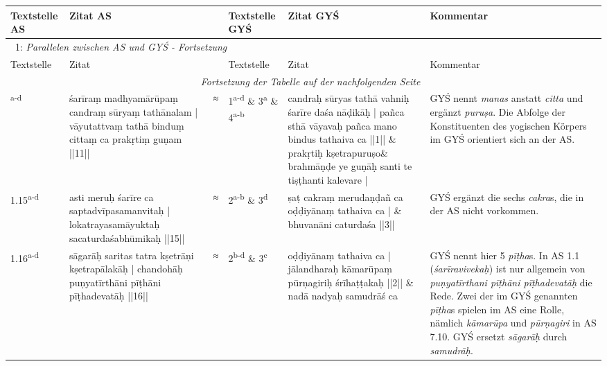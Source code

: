 \documentclass[a4paper,12pt]{article}
\begin{document}
{\RaggedRight
\label{tabelle}
\begingroup
{}
\endgroup
\setlength{\extrarowheight}{.5em}
\begin{tabularx}{\textwidth}{p{}|p{}|p{}|p{}|p{}|p{}}  
  Textstelle AS & Zitat AS & \phantom & Textstelle GYŚ & Zitat GYŚ & Kommentar\\
  \endfirsthead
\multicolumn{5}{l}{\tablename\ 1: \textit{Parallelen zwischen AS und GYŚ - Fortsetzung\medskip \medskip}} \\
\hline
Textstelle & Zitat & \phantom & Textstelle & Zitat & Kommentar\\
\hline
\endhead
\hline \multicolumn{5}{r}{\textit{Fortsetzung der Tabelle auf der nachfolgenden Seite}} \\
\endfoot
\hline
\endlastfoot
  
\hline
1.11\textsuperscript{a-d} & śarīraṃ madhyamārūpaṃ candraṃ sūryaṃ tathānalam | vāyutattvaṃ tathā binduṃ cittaṃ ca prakṛtiṃ guṇam ||11|| & ≈ & 1\textsuperscript{a-d} \& 3\textsuperscript{a} \& 4\textsuperscript{a-b} & candraḥ sūryas tathā vahniḥ śarīre daśa nāḍikāḥ | pañca sthā vāyavaḥ pañca mano bindus tathaiva ca ||1|| \newline \& \newline prakṛtiḥ kṣetrapuruṣo\newline \& \newline brahmāṇḍe ye guṇāḥ santi te tiṣṭhanti kalevare | & GYŚ nennt \textit{manas} anstatt \textit{citta} und ergänzt \textit{puruṣa}. Die Abfolge der Konstituenten des yogischen Körpers im GYŚ orientiert sich an der AS.\\

\hline
1.15\textsuperscript{a-d} & \raggedright{asti meruḥ śarīre ca saptadvīpasamanvitaḥ | lokatrayasamāyuktaḥ sacaturdaśabhūmikaḥ ||15||} & ≈ & 2\textsuperscript{a-b} \& 3\textsuperscript{d} & ṣaṭ cakraṃ merudaṇḍañ ca oḍḍiyānaṃ tathaiva ca | \newline \& \newline bhuvanāni caturdaśa ||3|| & GYŚ ergänzt die sechs \textit{cakra}s, die in der AS nicht vorkommen. \\

\hline
1.16\textsuperscript{a-d} & sāgarāḥ saritas tatra kṣetrāṇi kṣetrapālakāḥ | chandohāḥ puṇyatīrthāni pīṭhāni pīṭhadevatāḥ ||16|| & ≈ & 2\textsuperscript{b-d} \& 3\textsuperscript{c} & oḍḍiyānaṃ tathaiva ca | jālandharaḥ kāmarūpaṃ pūrṇagiriḥ śrīhaṭṭakaḥ ||2|| \newline \& \newline nadā nadyaḥ samudrāś ca & GYŚ nennt hier 5 \textit{pīṭha}s. In AS 1.1 (\textit{śarīravivekaḥ}) ist nur allgemein von \textit{puṇyatīrthani pīṭhāni pīṭhadevatāḥ} die Rede. Zwei der im GYŚ genannten \textit{pīṭha}s spielen im AS eine Rolle, nämlich \textit{kāmarūpa} und \textit{pūrṇagiri} in AS 7.10. GYŚ ersetzt \textit{sāgarāḥ} durch \textit{samudrāḥ}.\\


\end{tabularx}}
\end{document}

